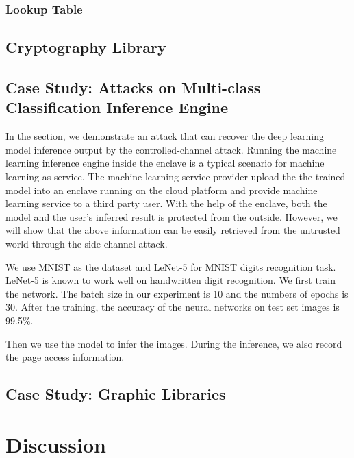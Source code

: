 \subsubsection{Lookup Table}



\subsection{Cryptography Library}


\subsection{Case Study: Attacks on Multi-class Classification Inference Engine}
In the section, we demonstrate an attack that can recover the deep learning model inference output by the controlled-channel attack. Running the machine learning inference engine inside the enclave is a typical scenario for machine learning as service. The machine learning service provider upload the the trained model into an enclave running on the cloud platform and provide machine learning service to a third party user. With the help of the enclave, both the model and the user's inferred result is protected from the outside. However, we will show that the above information can be easily retrieved from the untrusted world through the side-channel attack.

We use MNIST as the dataset and LeNet-5 for MNIST digits recognition task. LeNet-5 is known to work well on handwritten digit recognition. We first train the network. The batch size in our experiment is 10 and the numbers of epochs is 30. After the training, the accuracy of the neural networks on test set images is 99.5\%.

Then we use the model to infer the images. During the inference, we also record the page access information. 

\subsection{Case Study: Graphic Libraries}


\section{Discussion}

